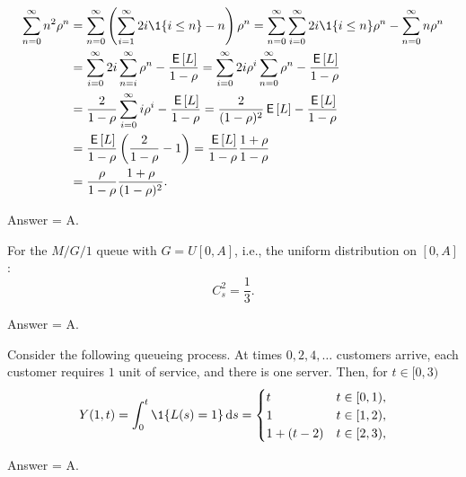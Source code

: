 \begin{exercise}[201703]
\begin{equation*}
  \begin{split}
    \sum_{n=0}^\infty n^2 \rho^n 
&=    \sum_{n=0}^\infty \left(\sum_{i=1}^\infty 2i \1{i\leq n}  - n\right)\rho^n 
=    \sum_{n=0}^\infty \sum_{i=0}^\infty 2i\1{i\leq n}\rho^n  - \sum_{n=0}^\infty n\rho^n \\
&=    \sum_{i=0}^\infty 2i \sum_{n=i}^\infty \rho^n  - \frac{\E L}{1-\rho} 
=    \sum_{i=0}^\infty 2i \rho^i \sum_{n=0}^\infty \rho^n  - \frac{\E L}{1-\rho} \\
&=    \frac2{1-\rho} \sum_{i=0}^\infty i \rho^i   - \frac{\E L}{1-\rho} 
=    \frac2{(1-\rho)^2} \E L - \frac{\E L}{1-\rho} \\
&=    \frac{\E L}{1-\rho}  \left(\frac2{1-\rho}  - 1\right) 
=    \frac{\E L}{1-\rho}  \frac{1+\rho}{1-\rho} \\
&=    \frac{\rho}{1-\rho}  \frac{1+\rho}{(1-\rho)^2}.
\end{split}
\end{equation*}

\begin{solution}
    Answer = A.
\end{solution}
\end{exercise}

\begin{exercise}[201703]
  For the $M/G/1$ queue with $G=U[0,A]$, i.e., the uniform
  distribution on $[0,A]$: 
  \begin{equation*}
C_s^2 = \frac 13.
  \end{equation*}

\begin{solution}
    Answer = A.
\end{solution}
\end{exercise}

\begin{exercise}[201704]%
  Consider the following queueing process. At times
  $0, 2,4, \ldots$ customers arrive, each customer requires $1$ unit
  of service, and there is one server.  Then, for $t\in[0,3)$
    \begin{equation*}
      Y(1,t) = \int_0^t \1{L(s) = 1}\d s = 
      \begin{cases}
        t & t\in[0,1), \\
        1 & t\in[1,2), \\
        1+(t-2) & t\in[2,3), \\
      \end{cases}
    \end{equation*}
\begin{solution} Answer = A.
\end{solution}
\end{exercise}

